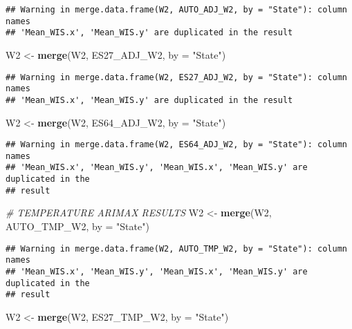 \documentclass[
]{article}
\newenvironment{Shaded}{\begin{snugshade}}{\end{snugshade}}
\newcommand{\AttributeTok}[1]{\textcolor[rgb]{0.13,0.29,0.53}{#1}}
\newcommand{\CommentTok}[1]{\textcolor[rgb]{0.56,0.35,0.01}{\textit{#1}}}
\newcommand{\FunctionTok}[1]{\textcolor[rgb]{0.13,0.29,0.53}{\textbf{#1}}}
\newcommand{\NormalTok}[1]{#1}
\newcommand{\OtherTok}[1]{\textcolor[rgb]{0.56,0.35,0.01}{#1}}
\newcommand{\StringTok}[1]{\textcolor[rgb]{0.31,0.60,0.02}{#1}}
\begin{document}
\begin{verbatim}
## Warning in merge.data.frame(W2, AUTO_ADJ_W2, by = "State"): column names
## 'Mean_WIS.x', 'Mean_WIS.y' are duplicated in the result
\end{verbatim}

\begin{Shaded}
\begin{Highlighting}[]
\NormalTok{W2 }\OtherTok{\textless{}{-}} \FunctionTok{merge}\NormalTok{(W2, ES27\_ADJ\_W2, }\AttributeTok{by =} \StringTok{"State"}\NormalTok{)}
\end{Highlighting}
\end{Shaded}

\begin{verbatim}
## Warning in merge.data.frame(W2, ES27_ADJ_W2, by = "State"): column names
## 'Mean_WIS.x', 'Mean_WIS.y' are duplicated in the result
\end{verbatim}

\begin{Shaded}
\begin{Highlighting}[]
\NormalTok{W2 }\OtherTok{\textless{}{-}} \FunctionTok{merge}\NormalTok{(W2, ES64\_ADJ\_W2, }\AttributeTok{by =} \StringTok{"State"}\NormalTok{)}
\end{Highlighting}
\end{Shaded}

\begin{verbatim}
## Warning in merge.data.frame(W2, ES64_ADJ_W2, by = "State"): column names
## 'Mean_WIS.x', 'Mean_WIS.y', 'Mean_WIS.x', 'Mean_WIS.y' are duplicated in the
## result
\end{verbatim}

\begin{Shaded}
\begin{Highlighting}[]
\CommentTok{\# TEMPERATURE ARIMAX RESULTS}
\NormalTok{W2 }\OtherTok{\textless{}{-}} \FunctionTok{merge}\NormalTok{(W2, AUTO\_TMP\_W2, }\AttributeTok{by =} \StringTok{"State"}\NormalTok{)}
\end{Highlighting}
\end{Shaded}

\begin{verbatim}
## Warning in merge.data.frame(W2, AUTO_TMP_W2, by = "State"): column names
## 'Mean_WIS.x', 'Mean_WIS.y', 'Mean_WIS.x', 'Mean_WIS.y' are duplicated in the
## result
\end{verbatim}

\begin{Shaded}
\begin{Highlighting}[]
\NormalTok{W2 }\OtherTok{\textless{}{-}} \FunctionTok{merge}\NormalTok{(W2, ES27\_TMP\_W2, }\AttributeTok{by =} \StringTok{"State"}\NormalTok{)}
\end{Highlighting}
\end{Shaded}
\end{document}
